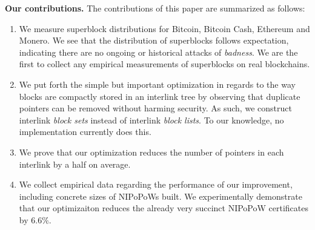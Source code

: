 \noindent
\textbf{Our contributions.} The contributions of this paper are summarized as
follows:

\begin{enumerate}
  \item We measure superblock distributions for Bitcoin, Bitcoin Cash, Ethereum
        and Monero. We see that the distribution of superblocks follows
        expectation, indicating there are no ongoing or historical attacks of
        \emph{badness}. We are the first to collect any empirical measurements
        of superblocks on real blockchains.
  \item We put forth the simple but important optimization in regards to the way
        blocks are compactly stored in an interlink tree by observing that
        duplicate pointers can be removed without harming security. As such, we
        construct interlink \emph{block sets} instead of interlink \emph{block
        lists}. To our knowledge, no implementation currently does this.
  \item We prove that our optimization reduces the number of pointers in each
        interlink by a half on average.
  \item We collect empirical data regarding the performance of our improvement,
        including concrete sizes of NIPoPoWs built. We experimentally
        demonstrate that our optimizaiton reduces the already very succinct
        NIPoPoW certificates by $6.6\%$.
\end{enumerate}
